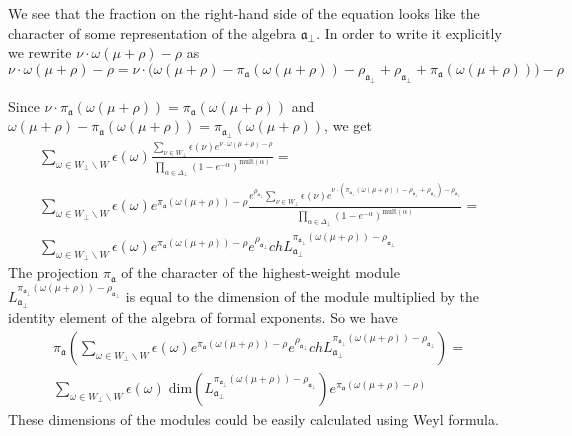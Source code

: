 \documentclass[a4paper,12pt]{article}
\theoremstyle{definition} \newtheorem{Def}{Definition}
\begin{document}
We see that the fraction on the right-hand side of the equation looks like the character of some representation of the algebra $\mathfrak{a}_{\bot}$. 
In order to write it explicitly we rewrite $\nu\cdot\omega(\mu+\rho)-\rho$ as
\begin{equation}
  \label{eq:30}
  \nu\cdot\omega(\mu+\rho)-\rho=\nu\cdot \bigl(\omega(\mu+\rho)-\pi_{\mathfrak{a}}(\omega(\mu+\rho))-\rho_{\mathfrak{a}_{\bot}}+\rho_{\mathfrak{a}_{\bot}}+\pi_{\mathfrak{a}}(\omega(\mu+\rho))\bigr)-\rho
\end{equation}

Since $\nu\cdot \pi_{\mathfrak{a}}(\omega(\mu+\rho))=\pi_{\mathfrak{a}}(\omega(\mu+\rho))$ and $\omega(\mu+\rho)-\pi_{\mathfrak{a}}(\omega(\mu+\rho))=\pi_{\mathfrak{a}_{\bot}}(\omega(\mu+\rho))$, we get
\begin{multline}
  \label{eq:14}
  \sum_{\omega\in W_{\bot}\backslash W} \epsilon(\omega) \frac{\sum_{\nu\in W_{\bot}}\epsilon(\nu) e^{\nu \cdot \omega(\mu+\rho)-\rho}}{\prod_{\alpha\in\Delta_{\bot}}(1-e^{-\alpha})^{\mathrm{mult}(\alpha)}} =\\
  \sum_{\omega\in W_{\bot}\backslash W} \epsilon(\omega) e^{\pi_{\mathfrak{a}}(\omega(\mu+\rho))-\rho} \frac{e^{\rho_{\mathfrak{a}_{\bot}} }\sum_{\nu\in W_{\bot}}\epsilon(\nu) e^{\nu \cdot (\pi_{\mathfrak{a}_{\bot}}(\omega(\mu+\rho))-\rho_{\mathfrak{a}_{\bot}}+\rho_{\mathfrak{a}_{\bot}})-\rho_{\mathfrak{a}_{\bot}}}}{\prod_{\alpha\in\Delta_{\bot}}(1-e^{-\alpha})^{\mathrm{mult}(\alpha)}}=\\
  \sum_{\omega\in W_{\bot}\backslash W} \epsilon(\omega) e^{\pi_{\mathfrak{a}}(\omega(\mu+\rho))-\rho}e^{\rho_{\mathfrak{a}_{\bot}}} ch L^{\pi_{\mathfrak{a}_{\bot}}(\omega(\mu+\rho))-\rho_{\mathfrak{a}_{\bot}}}_{\mathfrak{a}_{\bot}}
\end{multline}
The projection $\pi_{\mathfrak{a}}$ of the character of the highest-weight module $L^{\pi_{\mathfrak{a}_{\bot}}(\omega(\mu+\rho))-\rho_{\mathfrak{a}_{\bot}}}_{\mathfrak{a}_{\bot}}$ is equal to the dimension of the module multiplied by the identity element of the algebra of formal exponents. So we have
  \begin{multline}
    \label{eq:15}
    \pi_{\mathfrak{a}}\left( \sum_{\omega\in W_{\bot}\backslash W} \epsilon(\omega) e^{\pi_{\mathfrak{a}}(\omega(\mu+\rho))-\rho}e^{\rho_{\mathfrak{a}_{\bot}}} ch L^{\pi_{\mathfrak{a}_{\bot}}(\omega(\mu+\rho))-\rho_{\mathfrak{a}_{\bot}}}_{\mathfrak{a}_{\bot}}\right) = \\
    \sum_{\omega\in W_{\bot}\backslash W} \epsilon(\omega)\; \mathrm{dim}\left(L^{\pi_{\mathfrak{a}_{\bot}}(\omega(\mu+\rho))-\rho_{\mathfrak{a}_{\bot}}}_{\mathfrak{a}_{\bot}}\right) e^{\pi_{\mathfrak{a}}(\omega(\mu+\rho)-\rho)}
  \end{multline}
These dimensions of the modules could be easily calculated using Weyl formula.
\end{document}
